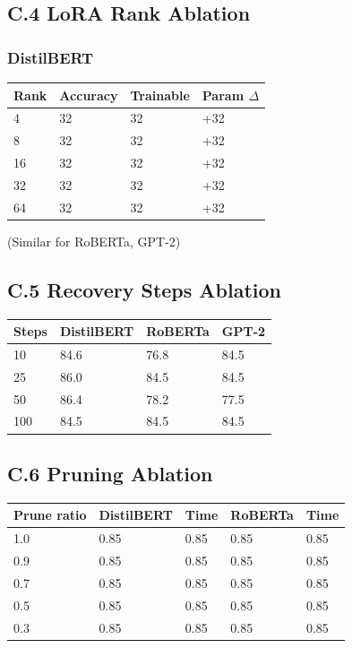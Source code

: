 \subsection{C.4 LoRA Rank Ablation}

\subsubsection{DistilBERT}

\begin{table}[H]
\centering
\small
\begin{tabular}{llll}
\toprule
\textbf{Rank} & \textbf{Accuracy} & \textbf{Trainable} & \textbf{Param $\Delta$} \\
\midrule
4 & 32 & 32 & +32 \\
8 & 32 & 32 & +32 \\
16 & 32 & 32 & +32 \\
32 & 32 & 32 & +32 \\
64 & 32 & 32 & +32 \\
\bottomrule
\end{tabular}
\end{table}

(Similar for RoBERTa, GPT-2)

\subsection{C.5 Recovery Steps Ablation}

\begin{table}[H]
\centering
\small
\begin{tabular}{llll}
\toprule
\textbf{Steps} & \textbf{DistilBERT} & \textbf{RoBERTa} & \textbf{GPT-2} \\
\midrule
10 & 84.6 & 76.8 & 84.5 \\
25 & 86.0 & 84.5 & 84.5 \\
50 & 86.4 & 78.2 & 77.5 \\
100 & 84.5 & 84.5 & 84.5 \\
\bottomrule
\end{tabular}
\end{table}

\subsection{C.6 Pruning Ablation}

\begin{table}[H]
\centering
\small
\begin{tabular}{lllll}
\toprule
\textbf{Prune ratio} & \textbf{DistilBERT} & \textbf{Time} & \textbf{RoBERTa} & \textbf{Time} \\
\midrule
1.0 & 0.85 & 0.85 & 0.85 & 0.85 \\
0.9 & 0.85 & 0.85 & 0.85 & 0.85 \\
0.7 & 0.85 & 0.85 & 0.85 & 0.85 \\
0.5 & 0.85 & 0.85 & 0.85 & 0.85 \\
0.3 & 0.85 & 0.85 & 0.85 & 0.85 \\
\bottomrule
\end{tabular}
\end{table}

